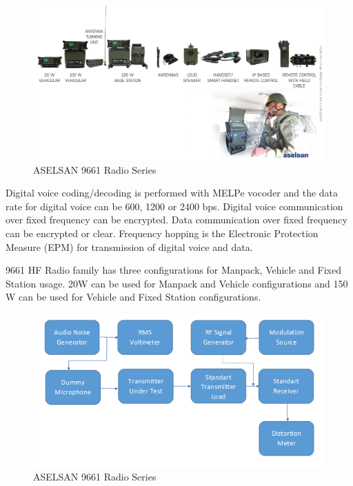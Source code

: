 \begin{figure}[H]
	\center
	\setlength{\unitlength}{\textwidth} 
	\includegraphics[width=1.0\unitlength]{radios}
	\caption{\label{fig:rads}ASELSAN 9661 Radio Series }
\end{figure}

	Digital voice coding/decoding is performed with MELPe vocoder and the data rate for digital voice can be 600, 1200 or 2400 bps. Digital voice communication over fixed frequency can be encrypted. Data communication over fixed frequency can be encrypted or clear. Frequency hopping is the Electronic Protection Measure (EPM) for transmission of digital voice and data.

	9661 HF Radio family has three configurations for Manpack, Vehicle and Fixed Station usage. 20W can be used for Manpack and Vehicle configurations and 150 W can be used for Vehicle and Fixed Station configurations.

\vfill

\begin{figure}[H]
	\center
	\setlength{\unitlength}{\textwidth} 
	\includegraphics[width=1.0\unitlength]{elecaudio}
	\caption{\label{fig:elecaudio}ASELSAN 9661 Radio Series }
\end{figure}





